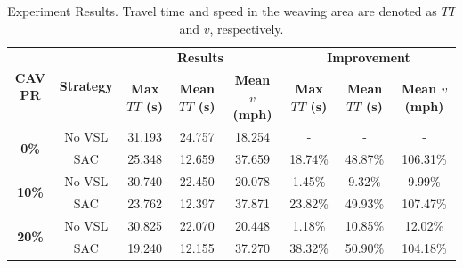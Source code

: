 \documentclass[11pt, letterpaper]{article}
\begin{document}
\begin{table}[!ht]
\caption{Experiment Results. Travel time and speed in the weaving area are denoted as $TT$ and $v$, respectively.}
\label{tab:2}
\centering
\begin{tabular}{@{}cccccccc@{}}
\toprule
\multirow{2}{*}{\textbf{CAV PR}} & \multirow{2}{*}{\textbf{Strategy}} & \multicolumn{3}{c}{\textbf{Results}}                                                     & \multicolumn{3}{c}{\textbf{Improvement}}                                                 \\ \cmidrule(l){3-8} 
                                               &                                            & \textbf{Max $TT$ (s)} & \textbf{Mean $TT$ (s)} & \textbf{Mean $v$ (mph)} & \textbf{Max $TT$ (s)} & \textbf{Mean $TT$ (s)} & \textbf{Mean $v$ (mph)} \\ \midrule
\multirow{2}{*}{\textbf{0\%}}                  & No VSL                                     & 31.193                       & 24.757                        & 18.254                    & -                            & -                             & -                         \\
                                               & SAC                                        & 25.348                       & 12.659                        & 37.659                    & 18.74\%                      & 48.87\%                       & 106.31\%                  \\
\multirow{2}{*}{\textbf{10\%}}                 & No VSL                                     & 30.740                       & 22.450                        & 20.078                    & 1.45\%                       & 9.32\%                        & 9.99\%                    \\
                                               & SAC                                        & 23.762                       & 12.397                        & 37.871                    & 23.82\%                      & 49.93\%                       & 107.47\%                  \\
\multirow{2}{*}{\textbf{20\%}}                 & No VSL                                     & 30.825                       & 22.070                        & 20.448                    & 1.18\%                       & 10.85\%                       & 12.02\%                   \\
                                               & SAC                                        & 19.240                       & 12.155                        & 37.270                    & 38.32\%                      & 50.90\%                       & 104.18\%                  \\

\end{tabular}
\end{table}
\end{document}
